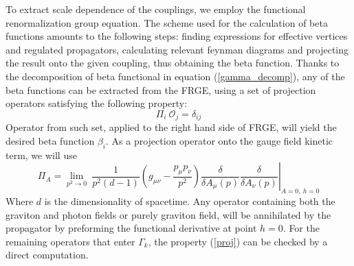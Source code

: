 \documentclass[11pt, a4paper]{article}
\begin{document}
To extract scale dependence of the couplings, we employ the functional renormalization group equation.
The scheme used for the calculation of beta functions amounts to the following steps: finding expressions for effective vertices and
regulated propagators, calculating relevant feynman diagrams and projecting the result onto the given coupling, thus obtaining the beta function.
Thanks to the decomposition of beta functional in equation (\ref{gamma_decomp}), any of the beta functions can be extracted
from the FRGE, using a set of projection operators satisfying the following property:
\begin{equation}
    \varPi_i \ \mathcal{O}_j = \delta_{ij}
    \label{proj}
\end{equation}
Operator from such set, applied to the right hand side of FRGE, will yield the desired beta function $\beta_i$.
As a projection operator onto the gauge field kinetic term, we will use
\begin{equation}
    \varPi_A = \left. \lim_{p^2 \rightarrow 0} \ \frac{1}{p^2 (d-1)} \left( g_{\mu\nu} - \frac{p_\mu p_\nu}{p^2} \right) \frac{\delta}{\delta A_\mu(p)} \frac{\delta}{\delta A_\nu(p)} \right|_{A=0, \ h=0}
    \label{projA}
\end{equation}
Where $d$ is the dimensionality of spacetime. 
Any operator containing both the graviton and photon fields or purely graviton field, will be annihilated
by the propagator by preforming the functional derivative at point $h=0$. For the remaining operators that enter $\Gamma_k$,
the property (\ref{proj}) can be checked by a direct computation.
\end{document}
